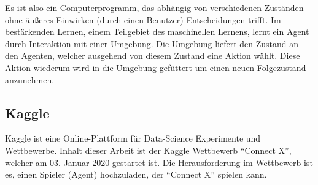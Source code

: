 Es ist also ein Computerprogramm, das abhängig von verschiedenen Zuständen ohne äußeres Einwirken (durch einen Benutzer) Entscheidungen trifft. Im bestärkenden Lernen, einem Teilgebiet des maschinellen Lernens, lernt ein Agent durch Interaktion mit einer Umgebung. Die Umgebung liefert den Zustand an den Agenten, welcher ausgehend von diesem Zustand eine Aktion wählt. Diese Aktion wiederum wird in die Umgebung gefüttert um einen neuen Folgezustand anzunehmen.


\subsection{Kaggle}
Kaggle ist eine Online-Plattform für Data-Science Experimente und Wettbewerbe. 
Inhalt dieser Arbeit ist der Kaggle Wettbewerb “Connect X”, welcher am 03. Januar 2020 gestartet ist. Die Herausforderung im Wettbewerb ist es, einen Spieler (Agent) hochzuladen, der “Connect X” spielen kann.
